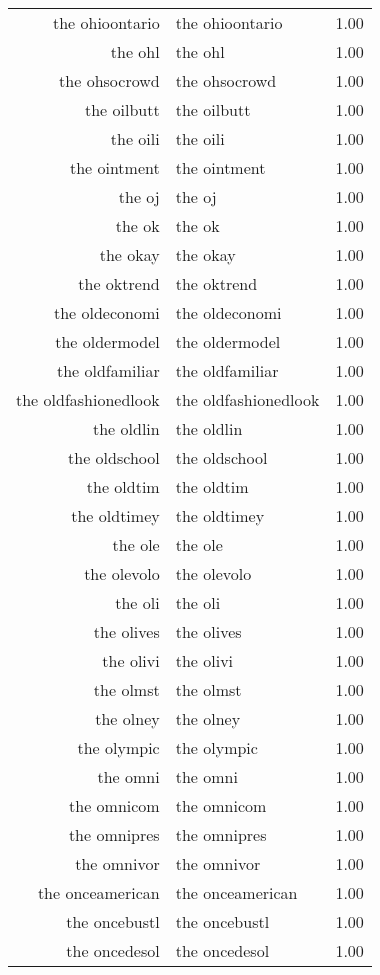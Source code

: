 \begin{table}[ht]
\begin{tabular}{rlr}
  the ohioontario & the ohioontario & 1.00 \\ 
  the ohl & the ohl & 1.00 \\ 
  the ohsocrowd & the ohsocrowd & 1.00 \\ 
  the oilbutt & the oilbutt & 1.00 \\ 
  the oili & the oili & 1.00 \\ 
  the ointment & the ointment & 1.00 \\ 
  the oj & the oj & 1.00 \\ 
  the ok & the ok & 1.00 \\ 
  the okay & the okay & 1.00 \\ 
  the oktrend & the oktrend & 1.00 \\ 
  the oldeconomi & the oldeconomi & 1.00 \\ 
  the oldermodel & the oldermodel & 1.00 \\ 
  the oldfamiliar & the oldfamiliar & 1.00 \\ 
  the oldfashionedlook & the oldfashionedlook & 1.00 \\ 
  the oldlin & the oldlin & 1.00 \\ 
  the oldschool & the oldschool & 1.00 \\ 
  the oldtim & the oldtim & 1.00 \\ 
  the oldtimey & the oldtimey & 1.00 \\ 
  the ole & the ole & 1.00 \\ 
  the olevolo & the olevolo & 1.00 \\ 
  the oli & the oli & 1.00 \\ 
  the olives & the olives & 1.00 \\ 
  the olivi & the olivi & 1.00 \\ 
  the olmst & the olmst & 1.00 \\ 
  the olney & the olney & 1.00 \\ 
  the olympic & the olympic & 1.00 \\ 
  the omni & the omni & 1.00 \\ 
  the omnicom & the omnicom & 1.00 \\ 
  the omnipres & the omnipres & 1.00 \\ 
  the omnivor & the omnivor & 1.00 \\ 
  the onceamerican & the onceamerican & 1.00 \\ 
  the oncebustl & the oncebustl & 1.00 \\ 
  the oncedesol & the oncedesol & 1.00 \\ 

\end{tabular}
\end{table}
